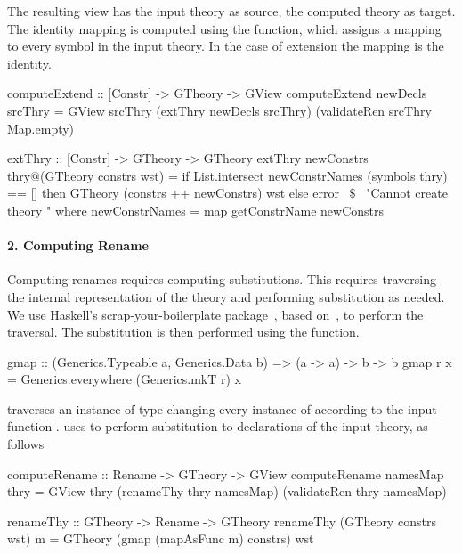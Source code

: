 The resulting view has the input theory as source, the computed theory as target. The identity mapping is computed using the  function, which assigns a mapping to every symbol in the input theory. In the case of extension the mapping is the identity. 
\begin{hscode}
computeExtend :: [Constr] -> GTheory -> GView
computeExtend newDecls srcThry =
  GView srcThry (extThry newDecls srcThry) (validateRen srcThry Map.empty)

extThry :: [Constr] -> GTheory -> GTheory 
extThry newConstrs thry@(GTheory constrs wst) =
  if List.intersect newConstrNames (symbols thry) == []
  then GTheory (constrs ++ newConstrs) wst
  else error ~$\$$~ "Cannot create theory "
    where newConstrNames = map getConstrName newConstrs
\end{hscode}

\paragraph{2. Computing Rename}
Computing renames requires computing substitutions. This requires traversing the internal representation of the theory and performing substitution as needed. We use Haskell's scrap-your-boilerplate package~\cite{syb}, based on~\cite{syb2003Jones}, to perform the traversal. The substitution is then performed using the  function. 
\begin{hscode} 
gmap :: (Generics.Typeable a, Generics.Data b) => (a -> a) -> b -> b
gmap r x = Generics.everywhere (Generics.mkT r) x  
\end{hscode} 
 traverses an instance of type  changing every instance of  according to the input function .  uses  to perform substitution to declarations of the input theory, as follows
\begin{hscode}
computeRename :: Rename -> GTheory -> GView  
computeRename namesMap thry =
  GView thry (renameThy thry namesMap) (validateRen thry namesMap)

renameThy :: GTheory -> Rename -> GTheory
renameThy (GTheory constrs wst) m =
  GTheory (gmap (mapAsFunc m) constrs) wst
\end{hscode}

